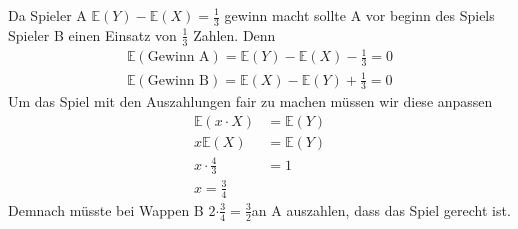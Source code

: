 \documentclass{article}
\newcommand{\E}{\mathbb{E}}
\begin{document}
\begin{enumerate}[a)]
            Da Spieler A $\E(Y)-\E(X)=\frac{1}{3}$
            gewinn macht sollte A vor beginn des Spiels
            Spieler B einen Einsatz von $\frac{1}{3}$\texteuro
            Zahlen.
            Denn
            \begin{align*}
                \E(\text{Gewinn A})=\E(Y)-\E(X)-\frac{1}{3}=0\\
                \E(\text{Gewinn B})=\E(X)-\E(Y)+\frac{1}{3}=0
            \end{align*}
            Um das Spiel mit den Auszahlungen fair zu machen müssen wir
            diese anpassen
            \begin{align*}
                \E(x\cdot X)&=\E(Y)\\
                x\E(X)&=\E(Y)\\
                x\cdot\frac{4}{3}&=1\\
                x=\frac{3}{4}
            \end{align*}
            Demnach müsste bei Wappen B $2$\texteuro$\cdot\frac{3}{4}=\frac{3}{2}$\texteuro an A
            auszahlen, dass das Spiel gerecht ist.
    \end{enumerate}
\end{document}
